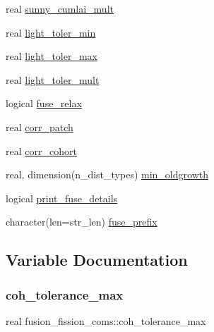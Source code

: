 \begin{DoxyCompactItemize}
\item 
real \hyperlink{namespacefusion__fission__coms_a75dd3af0dafb1c866f6b29f647227a79}{sunny\+\_\+cumlai\+\_\+mult}
\item 
real \hyperlink{namespacefusion__fission__coms_a18de7d0363e629bf717866e1be6d6784}{light\+\_\+toler\+\_\+min}
\item 
real \hyperlink{namespacefusion__fission__coms_a35ae334e26d06d11e6d7373a538694b9}{light\+\_\+toler\+\_\+max}
\item 
real \hyperlink{namespacefusion__fission__coms_aa0ffb9883c43635481ab9abb79b66de3}{light\+\_\+toler\+\_\+mult}
\item 
logical \hyperlink{namespacefusion__fission__coms_ae3996cd91b27f9b130517df7870d5869}{fuse\+\_\+relax}
\item 
real \hyperlink{namespacefusion__fission__coms_aa480a4503cfdfdbfc8c76fa5570672d1}{corr\+\_\+patch}
\item 
real \hyperlink{namespacefusion__fission__coms_ae94ecd34b091879520d758e554ec9efc}{corr\+\_\+cohort}
\item 
real, dimension(n\+\_\+dist\+\_\+types) \hyperlink{namespacefusion__fission__coms_a9cf3e613ab7d8869809784220ab99b1b}{min\+\_\+oldgrowth}
\item 
logical \hyperlink{namespacefusion__fission__coms_afaa756efb130d43d617b625105e6efc3}{print\+\_\+fuse\+\_\+details}
\item 
character(len=str\+\_\+len) \hyperlink{namespacefusion__fission__coms_a459ec82605ae0362d2556be00084a964}{fuse\+\_\+prefix}
\end{DoxyCompactItemize}


\subsection{Variable Documentation}
\mbox{\label{namespacefusion__fission__coms_a26b067f4070a314e0e5d2c52088aa6d9}} 
\subsubsection{\texorpdfstring{coh\+\_\+tolerance\+\_\+max}{coh\_tolerance\_max}}
{\footnotesize\ttfamily real fusion\+\_\+fission\+\_\+coms\+::coh\+\_\+tolerance\+\_\+max}

